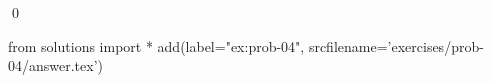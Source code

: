
\begin{ex} 
  \label{ex:prob-04}
  
  \qed
\end{ex} 
\begin{python0}
from solutions import *
add(label="ex:prob-04",
    srcfilename='exercises/prob-04/answer.tex') 
\end{python0}
